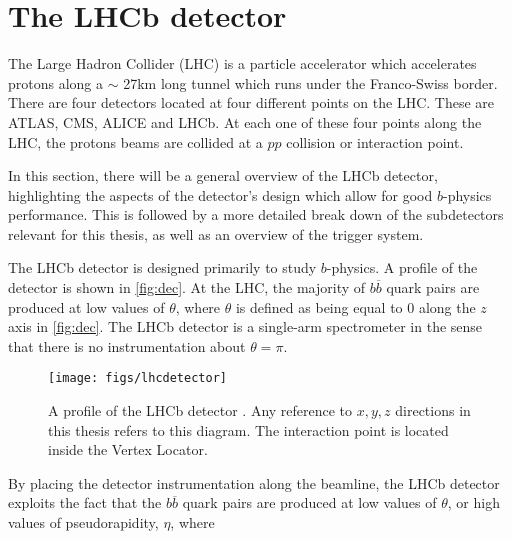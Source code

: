 \clearpage
\chapter{The LHCb detector}
\label{chap:dec}
The Large Hadron Collider (LHC) is a particle accelerator which accelerates protons along a $\sim$ 27km long tunnel which runs under the Franco-Swiss border. There are four detectors located at four different points on the \Gls{LHC}. These are \Gls{ATLAS}, \Gls{CMS}, \Gls{ALICE} and \Gls{LHCb}. At each one of these four points along the LHC, the protons beams are collided at a $pp$ collision or interaction point.


In this section, there will be a general overview of the LHCb detector, highlighting the aspects of the detector's design which allow for good $b$-physics performance. This is followed by a more detailed break down of the subdetectors relevant for this thesis, as well as an overview of the trigger system.




The \Gls{LHCb} detector is designed primarily to study $b$-physics. A profile of the detector is shown in \autoref{fig:dec}. At the LHC, the majority of $b\overline{b}$ quark pairs are produced at low values of $\theta$, where $\theta$ is defined as being equal to $0$ along the $z$ axis in \autoref{fig:dec}. The LHCb detector is a single-arm spectrometer in the sense that there is no instrumentation about $\theta = \pi$.




\begin{figure}[!h]
  \centering
  \texttt{[image: figs/lhcdetector]}
  \caption{A profile of the LHCb detector \cite{det_paper}. Any reference to $x, y ,z$ directions in this thesis refers to this diagram. The interaction point is located inside the Vertex Locator. %
  }
  \label{fig:dec}    
\end{figure}


By placing the detector instrumentation along the beamline, the LHCb detector exploits the fact that the $b\overline{b}$ quark pairs are produced at low values of $\theta$, or high values of pseudorapidity, $\eta$, where

